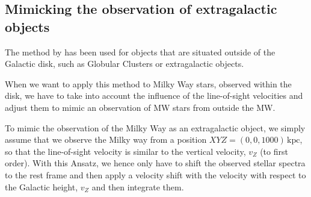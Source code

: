 \documentclass[]{aa}
\begin{document}
\subsection{Mimicking the observation of extragalactic objects}

The method by \cite{Boecker2019} has been used for objects that are situated outside of the Galactic disk, such as Globular Clusters or extragalactic objects.

When we want to apply this method to Milky Way stars, observed within the disk, we have to take into account the influence of the line-of-sight velocities and adjust them to mimic an observation of MW stars from outside the MW.

To mimic the observation of the Milky Way as an extragalactic object, we simply assume that we observe the Milky way from a position $XYZ = (0,0,1000)\,\mathrm{kpc}$, so that the line-of-sight velocity is similar to the vertical velocity, $v_Z$ (to first order). With this Ansatz, we hence only have to shift the observed stellar spectra to the rest frame and then apply a velocity shift with the velocity with respect to the Galactic height, $v_Z$ and then integrate them.

%

%




\label{LastPage}
\end{document}
